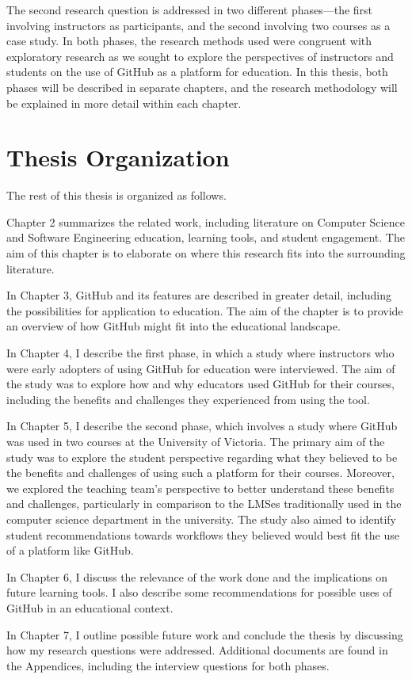 The second research question is addressed in two different phases---the first involving instructors as participants, and the second involving two courses as a case study. In both phases, the research methods used were congruent with exploratory research as we sought to explore the perspectives of instructors and students on the use of GitHub as a platform for education. In this thesis, both phases will be described in separate chapters, and the research methodology will be explained in more detail within each chapter.

\section{Thesis Organization}
The rest of this thesis is organized as follows.

Chapter 2 summarizes the related work, including literature on Computer Science and Software Engineering education, learning tools, and student engagement. The aim of this chapter is to elaborate on where this research fits into the surrounding literature.

In Chapter 3, GitHub and its features are described in greater detail, including the possibilities for application to education. The aim of the chapter is to provide an overview of how GitHub might fit into the educational landscape.

In Chapter 4, I describe the first phase, in which a study where instructors who were early adopters of using GitHub for education were interviewed. The aim of the study was to explore how and why educators used GitHub for their courses, including the benefits and challenges they experienced from using the tool.

In Chapter 5, I describe the second phase, which involves a study where GitHub was used in two courses at the University of Victoria. The primary aim of the study was to explore the student perspective regarding what they believed to be the benefits and challenges of using such a platform for their courses. Moreover, we explored the teaching team's perspective to better understand these benefits and challenges, particularly in comparison to the LMSes traditionally used in the computer science department in the university. The study also aimed to identify student recommendations towards workflows they believed would best fit the use of a platform like GitHub.

In Chapter 6, I discuss the relevance of the work done and the implications on future learning tools. I also describe some recommendations for possible uses of GitHub in an educational context.

In Chapter 7, I outline possible future work and conclude the thesis by discussing how my research questions were addressed. Additional documents are found in the Appendices, including the interview questions for both phases.



